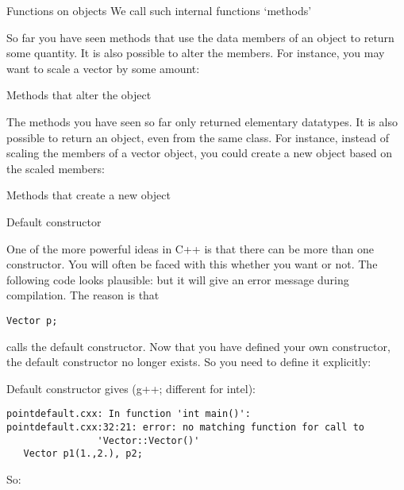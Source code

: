 \begin{slide}{Functions on objects}
  \label{sl:obj-func}
  We call such internal functions `methods'
\end{slide}

So far you have seen methods that use the data members of an object to
return some quantity. It is also possible to alter the members. 
For instance, you may want to scale a vector by some amount:
%

\begin{slide}{Methods that alter the object}
  \label{sl:obj-func-on}
\end{slide}

The methods you have seen so far only returned elementary
datatypes. It is also possible to return an object, even from the same
class. For instance, instead of scaling the members of a vector object, you
could create a new object based on the scaled members:
%

\begin{slide}{Methods that create a new object}
  \label{sl:obj-return}
\end{slide}

 {Default constructor}

One of the more powerful ideas in C++ is that there can be more than
one constructor. You will often be faced with this whether you want or
not. The following code looks plausible:
%
%
but it will give an error message during compilation. The reason is
that 
\begin{verbatim}
Vector p;
\end{verbatim}
calls the default constructor. Now that you have defined your own
constructor, the default constructor no longer exists. So you need to
define it explicitly:
%

\begin{slide}{Default constructor}
  \label{sl:obj-def-construct}
\small
  gives (g++; different for intel):
\begin{verbatim}
pointdefault.cxx: In function 'int main()':
pointdefault.cxx:32:21: error: no matching function for call to
                'Vector::Vector()'
   Vector p1(1.,2.), p2;
\end{verbatim}
So:
\end{slide}

